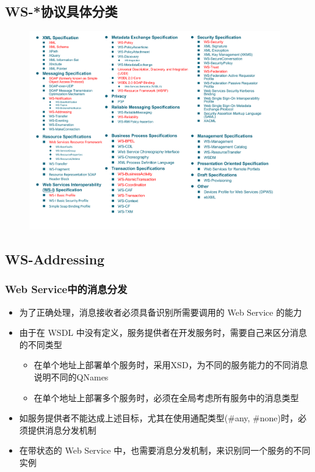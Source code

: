 \subsection{WS-*协议具体分类}
\begin{figure}[H]
    \vspace{-1em}
	\centering
	\includegraphics[width=0.97\textwidth]{images/WS-*协议具体分类.pdf}
    \vspace{-1.5em}
\end{figure}

\subsection{WS-Addressing}

\subsubsection{Web Service中的消息分发}
\begin{itemize}
    \item 为了正确处理，消息接收者必须具备识别所需要调用的 Web Service 的能力
    \item 由于在 WSDL 中没有定义，服务提供者在开发服务时，需要自己来区分消息的不同类型
    \begin{itemize}
        \item 在单个地址上部署单个服务时，采用XSD，为不同的服务能力的不同消息说明不同的QNames
        \item 在单个地址上部署多个服务时，必须在全局考虑所有服务中的消息类型
    \end{itemize}
    \item 如服务提供者不能达成上述目标，尤其在使用通配类型(\#any, \#none)时，必须提供消息分发机制
    \item 在带状态的 Web Service 中，也需要消息分发机制，来识别同一个服务的不同实例
\end{itemize}

